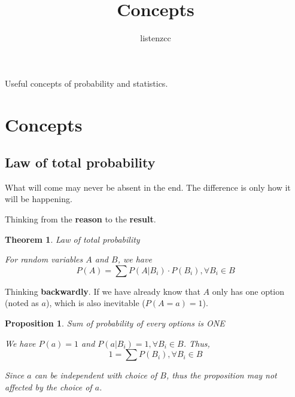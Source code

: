 

\newtheorem{theorem}{Theorem}[section]
\newtheorem{lemma}{Lemma}[section]
\newtheorem{proposition}{Proposition}[section]

\title{Concepts}
\author{listenzcc}



\maketitle

\abstract
Useful concepts of probability and statistics.

\tableofcontents

\section{Concepts}

\subsection{Law of total probability}

What will come may never be absent in the end.
The difference is only how it will be happening.

Thinking from the \textbf{reason} to the \textbf{result}.

\begin{theorem}
    \label{Theroem: Law of total probability}
    Law of total probability

    For random variables $A$ and $B$, we have
    \begin{equation*}
        P(A) = \sum {P(A|B_i) \cdot P(B_i)}, \forall B_i \in B
    \end{equation*}
\end{theorem}

Thinking \textbf{backwardly}.
If we have already know that $A$ only has one option (noted as $a$), which is also inevitable ($P(A=a) = 1$).

\begin{proposition}
    \label{Proposition: Sum of probability of every options is ONE}
    Sum of probability of every options is ONE

    We have $P(a) = 1$ and $P(a|B_i)=1, \forall B_i \in B$.
    Thus,
    \begin{equation*}
        1 = \sum P(B_i), \forall B_i \in B
    \end{equation*}

    Since $a$ can be independent with choice of $B$, thus the proposition may not affected by the choice of $a$.
\end{proposition}


